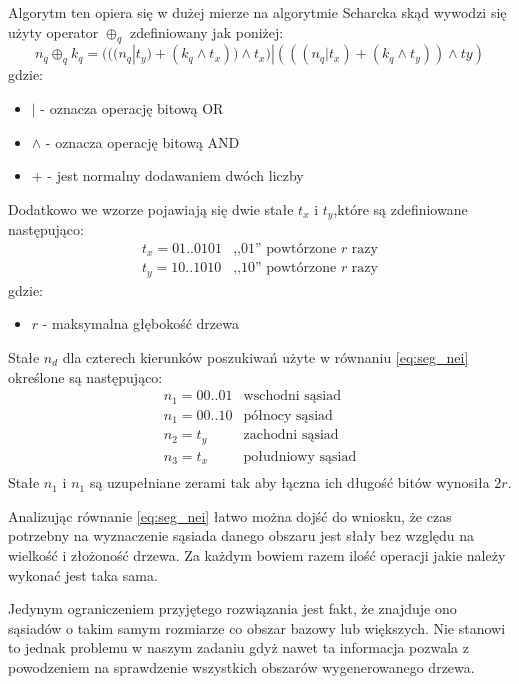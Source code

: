\documentclass{classrep}
\begin{document}
Algorytm ten opiera się w dużej mierze na algorytmie Scharcka skąd wywodzi się użyty operator $\oplus_{q}$ zdefiniowany jak poniżej:
\begin{equation}
n_{q}\oplus_{q}k_{q} = (((n_{q}|t_{y})+(k_{q}\wedge t_{x}))\wedge t_{x})|(((n_{q}|t_{x})+(k_{q}\wedge t_{y}))\wedge t{y})
\end{equation}
gdzie:
\begin{itemize}
\item $|$ - oznacza operację bitową OR
\item $\wedge$ - oznacza operację bitową AND
\item $+$ - jest normalny dodawaniem dwóch liczby
\end{itemize}

Dodatkowo we wzorze pojawiają się dwie stałe $t_{x}$ i $t_{y}$,które są zdefiniowane następująco:
\begin{equation*}
\begin{array}{cc}
t_{x} = 01..0101& \mbox{,,01'' powtórzone $r$ razy}\\
t_{y} = 10..1010& \mbox{,,10'' powtórzone $r$ razy}
\end{array}
\end{equation*}
gdzie:
\begin{itemize}
\item $r$ - maksymalna głębokość drzewa
\end{itemize}

Stałe $n_{d}$ dla czterech kierunków poszukiwań użyte w równaniu \ref{eq:seg_nei} określone są następująco:
\begin{equation*}
\begin{array}{lc}
n_{1} = 00..01& \mbox{wschodni sąsiad}\\
n_{1} = 00..10& \mbox{północy sąsiad}\\
n_{2} = t_{y}& \mbox{zachodni sąsiad}\\
n_{3} = t_{x}& \mbox{południowy sąsiad}\\
\end{array}
\end{equation*}
Stałe $n_{1}$ i $n_{1}$ są uzupełniane zerami tak aby łączna ich długość bitów wynosiła $2r$.

Analizując równanie \ref{eq:seg_nei} łatwo można dojść do wniosku, że czas potrzebny na wyznaczenie sąsiada danego obszaru jest słały bez względu na wielkość i złożoność drzewa. Za każdym bowiem razem ilość operacji jakie należy wykonać jest taka sama. 

Jedynym ograniczeniem przyjętego rozwiązania jest fakt, że znajduje ono sąsiadów o takim samym rozmiarze co obszar bazowy lub większych. Nie stanowi to jednak problemu w naszym zadaniu gdyż nawet ta informacja pozwala z powodzeniem na sprawdzenie wszystkich obszarów wygenerowanego drzewa.
\end{document}
